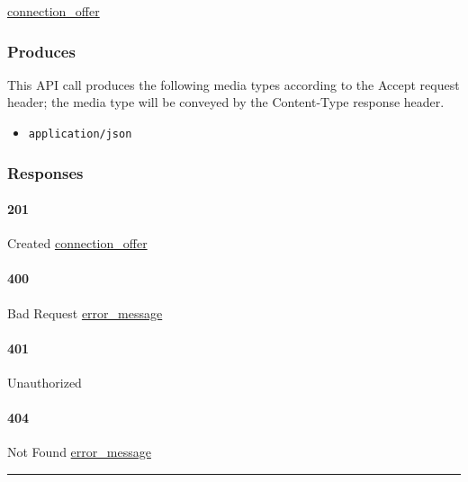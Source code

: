 \protect\hyperlink{connection_offer}{connection\_offer}

\hypertarget{produces-51}{%
\subsubsection{Produces}\label{produces-51}}

This API call produces the following media types according to the
{Accept} request header; the media type will be conveyed by the
{Content-Type} response header.

\begin{itemize}
\tightlist
\item
  \texttt{application/json}
\end{itemize}

\hypertarget{responses-51}{%
\subsubsection{Responses}\label{responses-51}}

\hypertarget{section-167}{%
\paragraph{201}\label{section-167}}

Created \protect\hyperlink{connection_offer}{connection\_offer}

\hypertarget{section-168}{%
\paragraph{400}\label{section-168}}

Bad Request \protect\hyperlink{error_message}{error\_message}

\hypertarget{section-169}{%
\paragraph{401}\label{section-169}}

Unauthorized \protect\hyperlink{}{}

\hypertarget{section-170}{%
\paragraph{404}\label{section-170}}

Not Found \protect\hyperlink{error_message}{error\_message}

\begin{center}\rule{0.5\linewidth}{\linethickness}\end{center}

